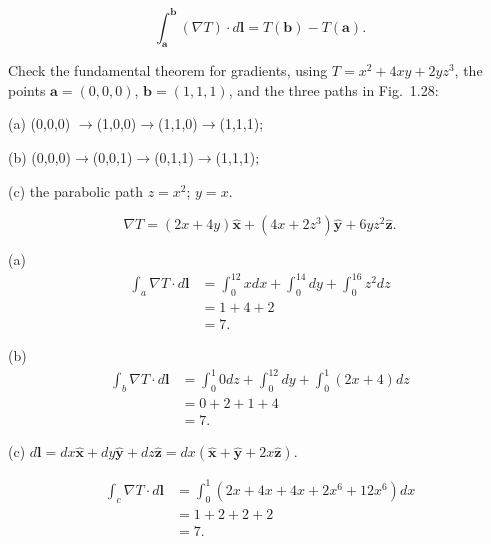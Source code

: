 \begin{equation}
    \int_\mathbf{a}^\mathbf{b} (\nabla T)\cdot d\mathbf{l} = T(\mathbf{b}) - T(\mathbf{a}).
\end{equation}
\begin{prob}[1.32]
    Check the fundamental theorem for gradients, using $T = x^2 + 4xy + 2yz^3$, the points $\mathbf{a} = (0,0,0)$, $\mathbf{b}=(1,1,1)$, and the three paths in Fig.~1.28:

    \noindent (a) (0,0,0) $\rightarrow$(1,0,0)$\rightarrow$(1,1,0)$\rightarrow$(1,1,1);

    \noindent (b) (0,0,0)$\rightarrow$(0,0,1)$\rightarrow$(0,1,1)$\rightarrow$(1,1,1);

    \noindent (c) the parabolic path $z = x^2$; $y = x$.
\end{prob}

\begin{sol}[1.32]
    \begin{equation}
        \nabla T = (2x + 4y)\mathbf{\hat{x}} + (4x + 2z^3)\mathbf{\hat{y}} + 6yz^2\mathbf{\hat{z}}.
    \end{equation}

    \noindent (a) 
    \begin{equation}
        \begin{aligned}
            \int_a \nabla T \cdot d\mathbf{l} &= \int_0^12xdx + \int_0^14dy + \int_0^16z^2 dz \\
            &=1 + 4 + 2 \\
            &=7.
        \end{aligned}
    \end{equation}

    \noindent (b)
    \begin{equation}
        \begin{aligned}
            \int_b\nabla T\cdot d\mathbf{l} &= \int_0^1 0 dz + \int_0^12dy + \int_0^1(2x + 4)dz \\
            &=0 + 2 + 1 + 4 \\
            &=7.
        \end{aligned}
    \end{equation}

    \noindent (c) $d\mathbf{l} = dx\mathbf{\hat{x}} + dy\mathbf{\hat{y}} + dz\mathbf{\hat{z}} = dx (\mathbf{\hat{x}} + \mathbf{\hat{y}} + 2x\mathbf{\hat{z}})$.

    \begin{equation}
        \begin{aligned}
            \int_c\nabla T\cdot d\mathbf{l} &= \int_0^1(2x + 4x + 4x + 2x^6 + 12x^6)dx \\
                &=1 + 2 + 2 + 2 \\
                &=7.
        \end{aligned}
    \end{equation}
\end{sol}

